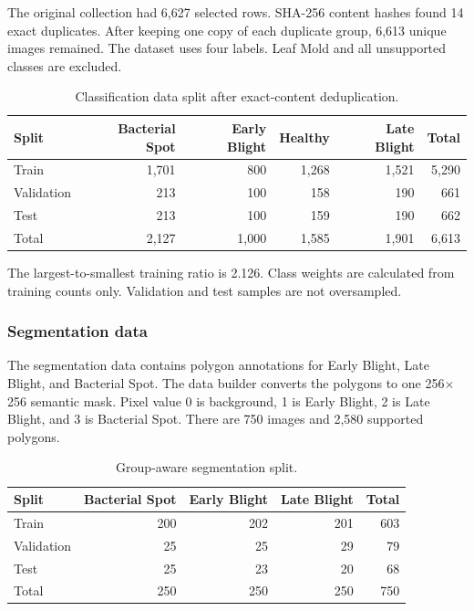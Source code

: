 \documentclass[12pt,a4paper]{article}
\begin{document}
The original collection had 6,627 selected rows. SHA-256 content hashes found 14 exact
duplicates. After keeping one copy of each duplicate group, 6,613 unique images remained.
The dataset uses four labels. Leaf Mold and all unsupported classes are excluded.

\begin{table}[H]
\centering
\caption{Classification data split after exact-content deduplication.}
\label{tab:classification-split}
\small
\begin{tabular}{lrrrrr}
\toprule
Split & Bacterial Spot & Early Blight & Healthy & Late Blight & Total\\
\midrule
Train & 1,701 & 800 & 1,268 & 1,521 & 5,290\\
Validation & 213 & 100 & 158 & 190 & 661\\
Test & 213 & 100 & 159 & 190 & 662\\
\midrule
Total & 2,127 & 1,000 & 1,585 & 1,901 & 6,613\\
\bottomrule
\end{tabular}
\end{table}

The largest-to-smallest training ratio is 2.126. Class weights are calculated from training
counts only. Validation and test samples are not oversampled.

\subsubsection{Segmentation data}
The segmentation data contains polygon annotations for Early Blight, Late Blight, and
Bacterial Spot. The data builder converts the polygons to one 256$\times$256 semantic
mask. Pixel value 0 is background, 1 is Early Blight, 2 is Late Blight, and 3 is Bacterial
Spot. There are 750 images and 2,580 supported polygons.

\begin{table}[H]
\centering
\caption{Group-aware segmentation split.}
\label{tab:segmentation-split}
\begin{tabular}{lrrrr}
\toprule
Split & Bacterial Spot & Early Blight & Late Blight & Total\\
\midrule
Train & 200 & 202 & 201 & 603\\
Validation & 25 & 25 & 29 & 79\\
Test & 25 & 23 & 20 & 68\\
\midrule
Total & 250 & 250 & 250 & 750\\
\bottomrule
\end{tabular}
\end{table}
\end{document}

